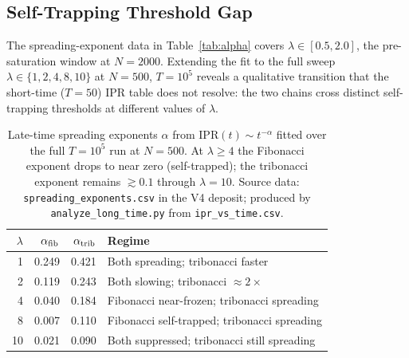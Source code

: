 %
%
%

\subsection{Self-Trapping Threshold Gap}
\label{sec:self_trapping}

The spreading-exponent data in Table~\ref{tab:alpha} covers
$\lambda \in [0.5, 2.0]$, the pre-saturation window at $N=2000$.
Extending the fit to the full sweep $\lambda \in \{1, 2, 4, 8, 10\}$
at $N=500$, $T=10^5$ reveals a qualitative transition that the
short-time ($T=50$) IPR table does not resolve: the two chains cross
distinct self-trapping thresholds at different values of $\lambda$.

\begin{table}[h]
\centering
\caption{Late-time spreading exponents $\alpha$ from
$\mathrm{IPR}(t) \sim t^{-\alpha}$ fitted over the full $T=10^5$ run at
$N=500$. At $\lambda \geq 4$ the Fibonacci exponent drops to near zero
(self-trapped); the tribonacci exponent remains $\gtrsim 0.1$ through
$\lambda = 10$. Source data: \texttt{spreading\_exponents.csv} in the
V4 deposit; produced by \texttt{analyze\_long\_time.py} from
\texttt{ipr\_vs\_time.csv}.}
\label{tab:alpha_full}
\begin{tabular}{r r r l}
\toprule
$\lambda$ & $\alpha_{\rm fib}$ & $\alpha_{\rm trib}$ & Regime \\
\midrule
1  & 0.249 & 0.421 & Both spreading; tribonacci faster \\
2  & 0.119 & 0.243 & Both slowing; tribonacci $\approx 2\times$ \\
4  & 0.040 & 0.184 & Fibonacci near-frozen; tribonacci spreading \\
8  & 0.007 & 0.110 & Fibonacci self-trapped; tribonacci spreading \\
10 & 0.021 & 0.090 & Both suppressed; tribonacci still spreading \\
\bottomrule
\end{tabular}
\end{table}

